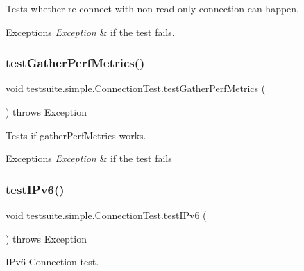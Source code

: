 Tests whether re-\/connect with non-\/read-\/only connection can happen.


\begin{DoxyExceptions}{Exceptions}
{\em Exception} & if the test fails. \\
\hline
\end{DoxyExceptions}
\mbox{\label{classtestsuite_1_1simple_1_1_connection_test_a3efc92c350b402367a66355fe3305381}} 
\subsubsection{\texorpdfstring{test\+Gather\+Perf\+Metrics()}{testGatherPerfMetrics()}}
{\footnotesize\ttfamily void testsuite.\+simple.\+Connection\+Test.\+test\+Gather\+Perf\+Metrics (\begin{DoxyParamCaption}{ }\end{DoxyParamCaption}) throws Exception}

Tests if gather\+Perf\+Metrics works.


\begin{DoxyExceptions}{Exceptions}
{\em Exception} & if the test fails \\
\hline
\end{DoxyExceptions}
\mbox{\label{classtestsuite_1_1simple_1_1_connection_test_aaac71a7d7f1811f8ca555a3f8fb2573b}} 
\subsubsection{\texorpdfstring{test\+I\+Pv6()}{testIPv6()}}
{\footnotesize\ttfamily void testsuite.\+simple.\+Connection\+Test.\+test\+I\+Pv6 (\begin{DoxyParamCaption}{ }\end{DoxyParamCaption}) throws Exception}

I\+Pv6 Connection test.


